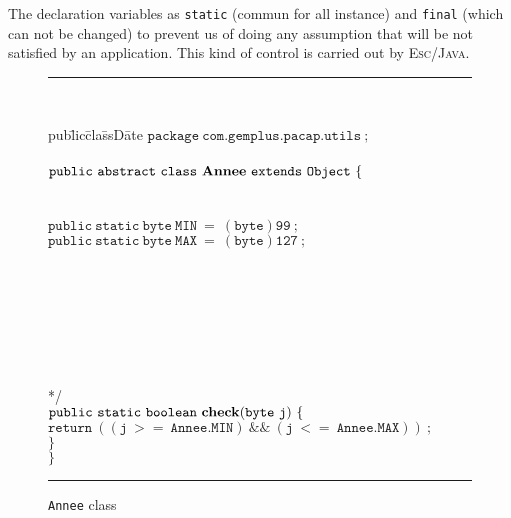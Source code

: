 The declaration variables as \texttt{static} (commun for all instance)
and \texttt{final} (which can not be changed) to prevent us of doing
any assumption that will be not satisfied by an application. This kind 
of control is carried out by \textsc{Esc/Java}. \\


\begin{center}
\begin{figure}[htb]
\rule{\linewidth}{0.3mm}
\\[2.0ex]
\begin{tabbing}
pub\=lic\=cla\=ssD\=ate  \kill
$\mathtt{package\ com.gemplus.pacap.utils\ ;}$ \\
 \\
$\mathtt{public\ abstract\ class\ {\bf Annee}\ extends\ Object\ \{}$ \\
 \\
 \\ 
\>$\mathtt{public\ static\ byte\ MIN\ =\ (byte)99\ ;} $\\
\>$\mathtt{public\ static\ byte\ MAX\ =\ (byte)127\ ;} $\\
\\
\\
 \\
\> \\
\> \\
\> \\
\> \\
\>*/ \\
\>$\mathtt{public\ static\ boolean\ {\bf check}(byte\ j)\ \{} $ \\
\>\>$\mathtt{return\ ((j\ >=\ Annee.MIN)\ \&\&\ (j\ <=\ Annee.MAX))\ ;}$  \\
\>$\mathtt{\}} $ \\
$\mathtt{\}} $ \\
\end{tabbing}
\caption{{\tt Annee} class}
\label{fig-cla-ann}
\rule{\linewidth}{0.3mm}
\end{figure}
\end{center}





